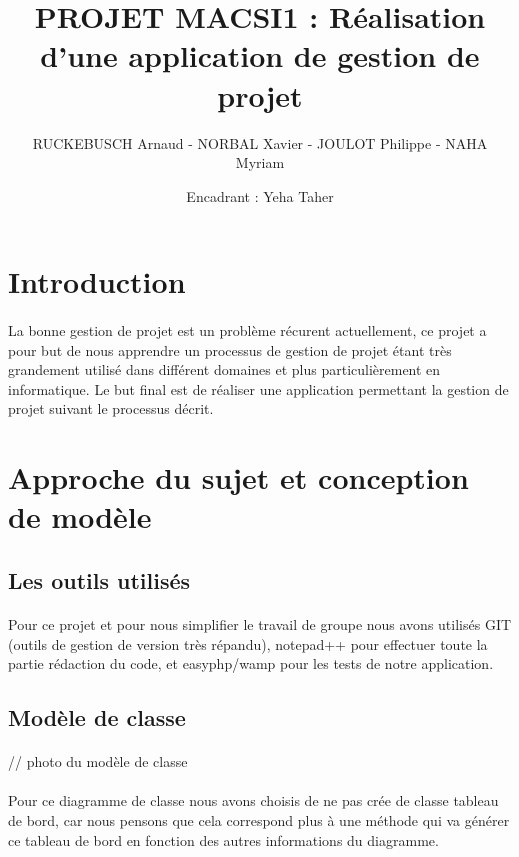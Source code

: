 \documentclass[a4paper, 12pt]{article}
\title{PROJET MACSI1 : Réalisation d'une application de gestion de projet }
\author{RUCKEBUSCH Arnaud - NORBAL Xavier - JOULOT Philippe - NAHA Myriam}
\date{Encadrant : Yeha Taher}
\makeatletter
\def\maketitle{
  \null
  \thispagestyle{empty}
  \vfill
  \begin{center}\leavevmode
    \normalfont
    {\LARGE \@title\par}
    \vskip 1cm
    {\Large \@author\par}
    \vskip 1cm
    {\Large \@date\par}
  \end{center}
  \vfill
  \null
  \cleardoublepage
  }
\makeatother
\begin{document}
\maketitle
\setcounter{page}{1}
\tableofcontents
\newpage



\section{Introduction}
\paragraph{}La bonne gestion de projet est un problème récurent actuellement, ce projet a pour but de nous apprendre un processus de gestion de projet étant très grandement utilisé dans différent domaines et plus particulièrement en informatique. Le but final est de réaliser une application permettant la gestion de projet suivant le processus décrit.

\newpage

\section{Approche du sujet et conception de modèle}

\subsection{Les outils utilisés}
\paragraph{}Pour ce projet et pour nous simplifier le travail de groupe nous avons utilisés GIT (outils de gestion de version très répandu), notepad++ pour effectuer toute la partie rédaction du code, et easyphp/wamp pour les tests de notre application.

\subsection{Modèle de classe}
\paragraph{} // photo du modèle de classe
\paragraph{}Pour ce diagramme de classe nous avons choisis de ne pas crée de classe tableau de bord, car nous pensons que cela correspond plus à une méthode qui va générer ce tableau de bord en fonction des autres informations du diagramme.
\end{document}
